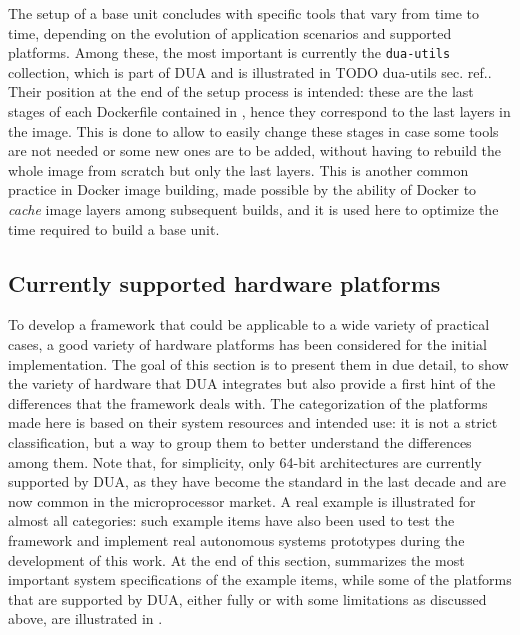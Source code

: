 The setup of a base unit concludes with specific tools that vary from time to time, depending on the evolution of application scenarios and supported platforms. Among these, the most important is currently the \texttt{dua-utils} collection, which is part of DUA and is illustrated in {\color{red}TODO dua-utils sec. ref.}. Their position at the end of the setup process is intended: these are the last stages of each Dockerfile contained in \cite{masocco_dua-foundation_nodate}, hence they correspond to the last layers in the image. This is done to allow to easily change these stages in case some tools are not needed or some new ones are to be added, without having to rebuild the whole image from scratch but only the last layers. This is another common practice in Docker image building, made possible by the ability of Docker to \emph{cache} image layers among subsequent builds, and it is used here to optimize the time required to build a base unit.

\subsection{Currently supported hardware platforms}
\label{sec:dua_supported_platforms}
To develop a framework that could be applicable to a wide variety of practical cases, a good variety of hardware platforms has been considered for the initial implementation. The goal of this section is to present them in due detail, to show the variety of hardware that DUA integrates but also provide a first hint of the differences that the framework deals with. The categorization of the platforms made here is based on their system resources and intended use: it is not a strict classification, but a way to group them to better understand the differences among them. Note that, for simplicity, only 64-bit architectures are currently supported by DUA, as they have become the standard in the last decade and are now common in the microprocessor market. A real example is illustrated for almost all categories: such example items have also been used to test the framework and implement real autonomous systems prototypes during the development of this work. At the end of this section,  summarizes the most important system specifications of the example items, while some of the platforms that are supported by DUA, either fully or with some limitations as discussed above, are illustrated in .

